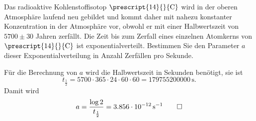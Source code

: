 Das radioaktive Kohlenstoffisotop $\prescript{14}{}{\text{C}}$ wird in der
oberen Atmosphäre laufend neu gebildet und kommt daher mit nahezu
konstanter Konzentration in der Atmosphäre vor, obwohl er mit einer
Halbwertszeit von $5700\pm 30$ Jahren zerfällt.
Die Zeit bis zum Zerfall eines einzelnen Atomkerns von
$\prescript{14}{}{\text{C}}$ 
ist exponentialverteilt. 
Bestimmen Sie den Parameter $a$ dieser Exponentialverteilung in
Anzahl Zerfällen pro Sekunde.

\begin{loesung}
Für die Berechnung von $a$ wird die Halbwertszeit in Sekunden benötigt,
sie ist
\[
t_{\frac12}
=
5700 \cdot 365 \cdot 24 \cdot 60 \cdot 60
=
179755200000\,\text{s}.
\]
Damit wird
\[
a
=
\frac{\log 2}{t_{\frac12}}
=
3.856 \cdot 10^{-12}\,\text{s}^{-1}
\qedhere
\]
\end{loesung}


